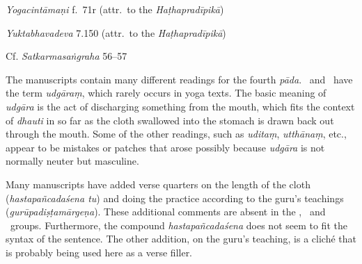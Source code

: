 \begin{ekdosis}
\begin{testimonia}[hp02_024]
\emph{Yogacintāmaṇi} f.~71r (attr.~to the \emph{Haṭhapradīpikā})

\begin{versinnote}
\end{versinnote}

\emph{Yuktabhavadeva} 7.150 (attr.~to the \emph{Haṭhapradīpikā})

\begin{versinnote}
\end{versinnote}

Cf. \emph{Satkarmasaṅgraha} 56–57

\begin{versinnote}
\end{versinnote}

\end{testimonia}

\begin{philcomm}[hp02_024]
The manuscripts contain many different readings for the fourth \emph{pāda}. \alphaThree\ and \etaOne\ have the term \emph{udgāraṃ}, which rarely occurs in yoga texts. The basic meaning of \emph{udgāra} is the act of discharging something from the mouth, which fits the context of \emph{dhauti} in so far as the cloth swallowed into the stomach is drawn back out through the mouth. Some of the other readings, such as \emph{uditaṃ}, \emph{utthānaṃ}, etc., appear to be mistakes or patches that arose possibly because \emph{udgāra} is not normally neuter but masculine.

Many manuscripts have added verse quarters on the length of the cloth (\emph{hastapañcadaśena tu}) and doing the practice according to the guru’s teachings (\emph{gurūpadiṣṭa\-mārgeṇa}). These additional comments are absent in the \textalpha, \textgamma\ and \textepsilon\ groups. Furthermore, the compound \emph{hastapañcadaśena} does not seem to fit the syntax of the sentence. The other addition, on the guru's teaching, is a cliché that is probably being used here as a verse filler.
\end{philcomm}



\end{ekdosis}
